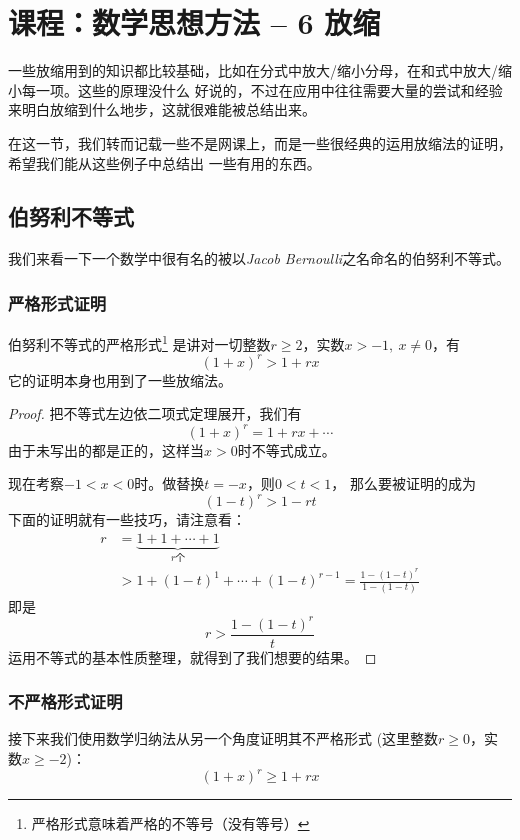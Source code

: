 \section{课程：数学思想方法 -- 6 放缩}
一些放缩用到的知识都比较基础，比如在分式中放大/缩小分母，在和式中放大/缩小每一项。这些的原理没什么
好说的，不过在应用中往往需要大量的尝试和经验来明白放缩到什么地步，这就很难能被总结出来。

在这一节，我们转而记载一些不是网课上，而是一些很经典的运用放缩法的证明，希望我们能从这些例子中总结出
一些有用的东西。

\subsection{伯努利不等式}
我们来看一下一个数学中很有名的被以\emph{Jacob Bernoulli}之名命名的伯努利不等式。
\subsubsection{严格形式证明}
伯努利不等式的严格形式\footnote{严格形式意味着严格的不等号（没有等号）}
是讲对一切整数$r \geq 2$，实数$x > -1,\ x \neq 0$，有
\begin{equation}
(1 + x)^r > 1 + rx
\end{equation}
它的证明本身也用到了一些放缩法。

\begin{proof}
把不等式左边依二项式定理展开，我们有
\begin{equation}
(1 + x)^r = 1 + rx + \cdots
\end{equation}
由于未写出的都是正的，这样当$x > 0$时不等式成立。

现在考察$-1 < x < 0$时。做替换$t=-x$，则$0 < t < 1$，
那么要被证明的成为
\[
(1 - t)^r > 1 - rt
\]
下面的证明就有一些技巧，请注意看：
\begin{align}
r 
&= \underbrace{1 + 1 + \cdots + 1}_{r\text{个}} \nonumber \\
&> 1 + (1-t)^1 + \cdots + (1-t)^{r-1} = \frac{1 - (1-t)^r}{1 - (1 - t)}
\end{align}
即是
\[
r > \frac{1 - (1-t)^r}{t}
\]
运用不等式的基本性质整理，就得到了我们想要的结果。
\end{proof}

\subsubsection{不严格形式证明}
接下来我们使用数学归纳法从另一个角度证明其不严格形式 (这里整数$r \geq 0$，实数$x \geq -2$)：
\[
(1 + x)^r \geq 1 + rx
\]

